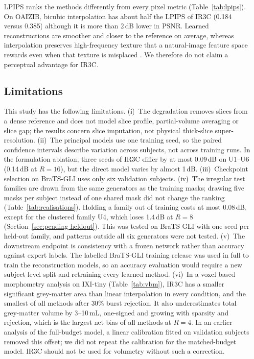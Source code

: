 \documentclass[a4paper,fleqn]{cas-dc}
\begin{document}
LPIPS ranks the methods differently from every pixel metric (Table~\ref{tab:lpips}). On
OAIZIB, bicubic interpolation has about half the LPIPS of IR3C (0.184 versus 0.385) although it
is more than 2\,dB lower in PSNR. Learned reconstructions are smoother and closer to the
reference on average, whereas interpolation preserves high-frequency texture that a
natural-image feature space rewards even when that texture is misplaced
\citep{blau2018perception}. We therefore do not claim a perceptual advantage for IR3C.

\subsection{Limitations}
\label{sec:limitations}

This study has the following limitations. (i)~The degradation removes slices from a dense
reference and does not model slice profile, partial-volume averaging or slice gap; the
results concern slice imputation, not physical thick-slice super-resolution. (ii)~The
principal models use one training seed, so the paired confidence intervals describe
variation across subjects, not across training runs. In the formulation ablation, three
seeds of IR3C differ by at most 0.09\,dB on U1--U6 (0.14\,dB at $R=16$), but the direct
model varies by almost 1\,dB. (iii)~Checkpoint selection on
BraTS-GLI uses only six validation subjects. (iv)~The irregular test families are drawn from
the same generators as the training masks; drawing five masks per subject instead of one
shared mask did not change the ranking (Table~\ref{tab:realisations}). Holding a family out
of training costs at most 0.08\,dB, except for the clustered family U4, which loses 1.4\,dB at
$R=8$ (Section~\ref{sec:pending-heldout}). This was tested on BraTS-GLI with one seed per
held-out family, and patterns outside all six generators were not tested. (v)~The downstream endpoint is consistency with a frozen
network rather than accuracy against expert labels. The labelled BraTS-GLI training release
was used in full to train the reconstruction models, so an accuracy evaluation would require
a new subject-level split and retraining every learned method. (vi)~In a voxel-based morphometry
analysis on IXI-tiny (Table~\ref{tab:vbm}), IR3C has a smaller significant grey-matter area
than linear interpolation in every condition, and the smallest of all methods after 30\%
burst rejection. It also underestimates total grey-matter volume by 3--10\,mL, one-signed
and growing with sparsity and rejection, which is the largest net bias of all methods at
$R=4$. In an earlier analysis of the full-budget model, a linear calibration fitted on
validation subjects removed this offset; we did not repeat the calibration for the
matched-budget model. IR3C should not be used for volumetry without such a correction.
\end{document}
